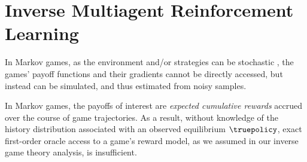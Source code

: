 \section{Inverse Multiagent Reinforcement Learning}
\label{sec:inverse_marl}



In Markov games, as the environment   and/or strategies can be stochastic , the games' payoff functions and their gradients cannot be directly accessed, but instead can be simulated, and thus estimated from noisy samples. 
\fi


In Markov games, the payoffs of interest are \emph{expected cumulative rewards} accrued over the course of game trajectories.
As a result, without knowledge of the history distribution associated with an observed equilibrium $\truepolicy$, exact first-order oracle access to a game's reward model, as we assumed in our inverse game theory analysis, is insufficient.
\fi

